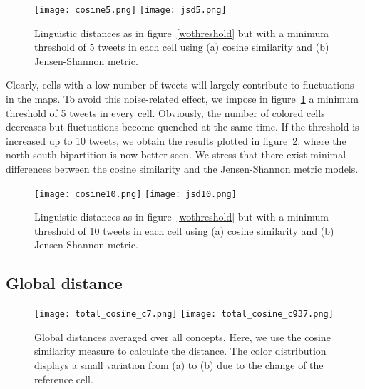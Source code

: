 \documentclass[11pt]{article}
\begin{document}
\begin{figure}[t]
\centering
{\texttt{[image: cosine5.png]}}
{\texttt{[image: jsd5.png]}}
\caption{Linguistic distances as in figure~\ref{wothreshold} but with a minimum threshold of 5 tweets in each cell using (a) cosine similarity and (b) Jensen-Shannon metric.}
\label{threshold5}
\end{figure}

Clearly, cells with a low number of tweets will largely contribute to fluctuations in the maps. To avoid this noise-related effect,
we impose in figure~\ref{threshold5} a minimum threshold of 5 tweets in every cell. Obviously, the number of colored cells
decreases but fluctuations become quenched at the same time. If the threshold is increased up to 10 tweets,
we obtain the results plotted in figure~\ref{threshold10}, where the north-south bipartition is now better seen.
We stress that there exist minimal differences between the cosine similarity and the Jensen-Shannon metric models.

\begin{figure}[t]
\centering
{\texttt{[image: cosine10.png]}}
{\texttt{[image: jsd10.png]}}
\caption{Linguistic distances as in figure~\ref{wothreshold} but with a minimum threshold of 10 tweets in each cell using (a) cosine similarity and (b) Jensen-Shannon metric.}
\label{threshold10}
\end{figure}

\subsection{Global distance}

\begin{figure}[t]
\centering
{\texttt{[image: total\_cosine\_c7.png]}}
{\texttt{[image: total\_cosine\_c937.png]}}
\caption{Global distances averaged over all concepts. Here, we use the cosine similarity measure to calculate the distance. The color distribution displays a small variation from (a) to (b) due to the change of the reference cell.}
\label{totalcosine}
\end{figure} 
\end{document}
